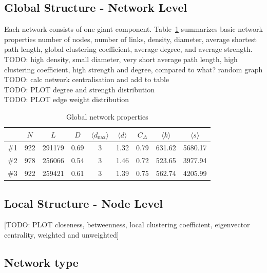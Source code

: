 \subsection{Global Structure - Network Level}
Each network consists of one giant component. Table~\ref{tab:stats} summarizes basic network properties number of nodes, number of links, density, diameter, average shortest path length, global clustering coefficient, average degree, and average strength.\\

TODO: high density, small diameter, very short average path length, high clustering coefficient, high strength and degree, compared to what? random graph\\

TODO: calc network centralisation and add to table\\
TODO: PLOT degree and strength distribution\\
TODO: PLOT edge weight distribution\\

\begin{table}
\centering
\begin{tabular}{lcccccccc}
\toprule
{} &  $N$ &   $L$ &  $D$ &  $\langle d_{\texttt{max}} \rangle$ &  $\langle d \rangle$ &   $C_\Delta$ &  $\langle k \rangle$ &  $\langle s \rangle$ \\
\midrule
\#1 &    922 &  291179 &     0.69 &         3 &              1.32 &  0.79 &      631.62 &      5680.17 \\
\#2 &    978 &  256066 &     0.54 &         3 &              1.46 &  0.72 &      523.65 &      3977.94 \\
\#3 &    922 &  259421 &     0.61 &         3 &              1.39 &  0.75 &      562.74 &      4205.99 \\
\bottomrule
\end{tabular}
\caption[Global network properties]{Global network properties}
\label{tab:stats}
\end{table}

\subsection{Local Structure - Node Level}

[TODO: PLOT closeness, betweenness, local clustering coefficient, eigenvector centrality, weighted and unweighted]

\subsection{Network type}

